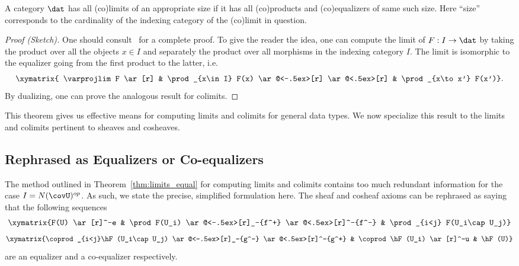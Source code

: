 \begin{thm}\label{thm:limits_equal}
	A category $\dat$ has all (co)limits of an appropriate size if it has all (co)products and (co)equalizers of same such size. Here ``size'' corresponds to the cardinality of the indexing category of the (co)limit in question.
\end{thm}
\begin{proof}[Proof (Sketch)]
One should consult~\cite[Prop. 5.22-3]{awodey} for a complete proof. To give the reader the idea, one can compute the limit of $F:I\to\dat$ by taking the product over all the objects $x\in I$ and separately the product over all morphisms in the indexing category $I$. The limit is isomorphic to the equalizer going from the first product to the latter, i.e.
\begin{equation*}
 \xymatrix{ \varprojlim F \ar[r] & \prod_{x\in I} F(x) \ar@<-.5ex>[r] \ar@<.5ex>[r] & \prod_{x\to x'} F(x')}.
\end{equation*}
By dualizing, one can prove the analogous result for colimits. 
\end{proof}

This theorem gives us effective means for computing limits and colimits for general data types. We now specialize this result to the limits and colimits pertinent to sheaves and cosheaves.

\subsection{Rephrased as Equalizers or Co-equalizers}
\label{subsubsec:equalizers}

The method outlined in Theorem~\ref{thm:limits_equal} for computing limits and colimits contains too much redundant information for the case $I=N(\covU)^{op}$. As such, we state the precise, simplified formulation here. The sheaf and cosheaf axioms can be rephrased as saying that the following sequences
\begin{equation*}
	\xymatrix{F(U) \ar[r]^-e & \prod F(U_i) \ar@<-.5ex>[r]_-{f^+} \ar@<.5ex>[r]^-{f^-} & \prod_{i<j} F(U_i\cap U_j)}
\end{equation*} 
\begin{equation*}
\xymatrix{\coprod_{i<j}\hF(U_i\cap U_j) \ar@<-.5ex>[r]_-{g^-} \ar@<.5ex>[r]^-{g^+} & \coprod \hF(U_i) \ar[r]^-u & \hF(U)}
\end{equation*}
are an equalizer and a co-equalizer respectively. 

